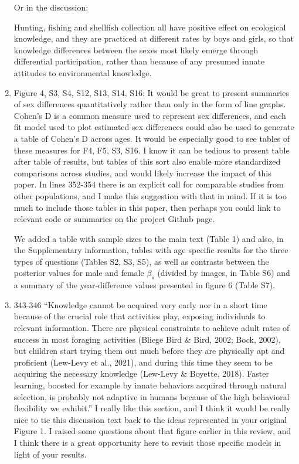 \documentclass{article}
\newcommand{\rev}[1]{{\color{Red}#1}}
\newcommand{\comment}[1]{{\color{Blue}#1}}
\begin{document}
\begin{enumerate}
    \comment{Or in the discussion:}
    
    \rev{Hunting, fishing and shellfish collection all have positive effect on \rev{ecological} knowledge, and they are practiced at different rates by boys and girls, so that knowledge differences between the sexes \rev{most likely }emerge through differential participation, rather than because of any presumed innate attitudes to environmental knowledge.}

    \item Figure 4, S3, S4, S12, S13, S14, S16: It would be great to present summaries of sex differences quantitatively rather than only in the form of line graphs. Cohen’s D is a common measure used to represent sex differences, and each fit model used to plot estimated sex differences could also be used to generate a table of Cohen’s D across ages. It would be especially good to see tables of these measures for F4, F5, S3, S16. I know it can be tedious to present table after table of results, but tables of this sort also enable more standardized comparisons across studies, and would likely increase the impact of this paper. In lines 352-354 there is an explicit call for comparable studies from other populations, and I make this suggestion with that in mind. If it is too much to include those tables in this paper, then perhaps you could link to relevant code or summaries on the project Github page.
    
    \comment{We added a table with sample sizes to the main text (Table 1) and also, in the Supplementary information, tables with age specific results for the three types of questions (Tables S2, S3, S5), as well as contrasts between the posterior values for male and female $\beta_s$ (divided by images, in Table S6) and a summary of the year-difference values presented in figure 6 (Table S7).}

    \item 343-346 “Knowledge cannot be acquired very early nor in a short time because of the crucial role that activities play, exposing individuals to relevant information. There are physical constraints to achieve adult rates of success in most foraging activities (Bliege Bird \& Bird, 2002; Bock, 2002), but children start trying them out much before they are physically apt and proficient (Lew-Levy et al., 2021), and during this time they seem to be acquiring the necessary knowledge (Lew-Levy \& Boyette, 2018). Faster learning, boosted for example by innate behaviors acquired through natural selection, is probably not adaptive in humans because of the high behavioral flexibility we exhibit.” I really like this section, and I think it would be really nice to tie this discussion text back to the ideas represented in your original Figure 1. I raised some questions about that figure earlier in this review, and I think there is a great opportunity here to revisit those specific models in light of your results.
    

\end{enumerate}
\end{document}
